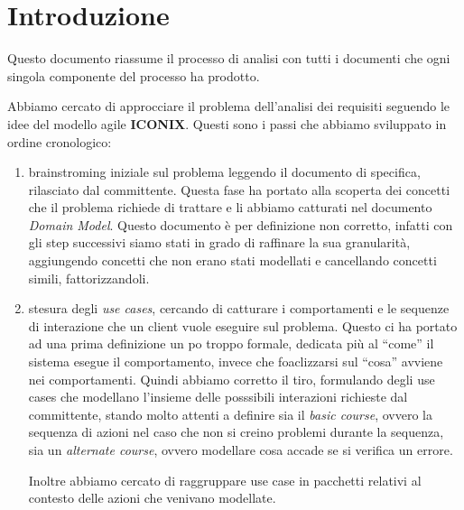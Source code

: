 \documentclass[a4paper, 12pt]{report}
\begin{document}
\tableofcontents

\newpage

\section*{Introduzione}
Questo documento riassume il processo di analisi con tutti i documenti che ogni
singola componente del processo ha prodotto.

Abbiamo cercato di approcciare il problema dell'analisi dei requisiti seguendo
le idee del modello agile \textbf{ICONIX}. Questi sono i passi che abbiamo
sviluppato in ordine cronologico:
\begin{enumerate}
  \item brainstroming iniziale sul problema leggendo il documento di specifica,
  rilasciato dal committente. Questa fase ha portato alla scoperta dei concetti
  che il problema richiede di trattare e li abbiamo catturati nel documento
  \emph{Domain Model}. Questo documento \`e per definizione non corretto,
  infatti con gli step successivi siamo stati in grado di raffinare la sua
  granularit\`a, aggiungendo concetti che non erano stati modellati e
  cancellando concetti simili, fattorizzandoli.
  \item stesura degli \emph{use cases}, cercando di catturare i comportamenti e
  le sequenze di interazione che un client vuole eseguire sul problema. Questo ci
  ha portato ad una prima definizione un po troppo formale, dedicata pi\`u al 
  ``come'' il sistema esegue il comportamento, invece che foaclizzarsi sul 
  ``cosa'' avviene nei comportamenti. Quindi abbiamo corretto il tiro,
  formulando degli use cases che modellano l'insieme delle posssibili
  interazioni richieste dal committente, stando molto attenti a definire sia il
  \emph{basic course}, ovvero la sequenza di azioni nel caso che non si creino
  problemi durante la sequenza, sia un \emph{alternate course}, ovvero
  modellare cosa accade se si verifica un errore. 
  
  Inoltre abbiamo cercato di raggruppare use case in pacchetti relativi al
  contesto delle azioni che venivano modellate.
\end{enumerate}
\end{document}
